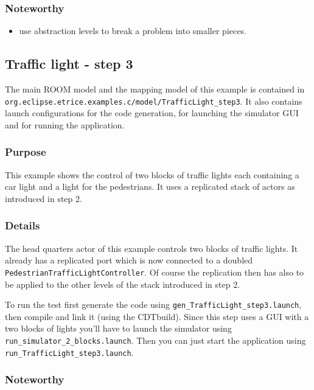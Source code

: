 \subsubsection{Noteworthy}

\begin{itemize}
\item use abstraction levels to break a problem into smaller pieces.
\end{itemize}

\subsection{Traffic light - step 3}

The main ROOM model and the mapping model of this example is contained
in \texttt{org.eclipse.etrice.examples.c/model/TrafficLight\_step3}.
It also contains launch configurations for the code generation, for
launching the simulator GUI and for
running the application.

\subsubsection{Purpose}

This example shows the control of two blocks of traffic lights
each containing a car light and a light for the pedestrians.
It uses a replicated stack of actors as introduced in step 2.

\subsubsection{Details}

The head quarters actor of this example controls two blocks of traffic
lights. It already has a replicated port which is now connected
to a doubled \texttt{PedestrianTrafficLightController}.
Of course the replication then has also to be applied to the other
levels of the stack introduced in step 2.

To run the test first generate the code using \texttt{gen\_TrafficLight\_step3.launch},
then compile and link it (using the CDTbuild). Since this step uses a GUI with a
two blocks of lights
you'll have to launch the simulator using \texttt{run\_simulator\_2\_blocks.launch}.
Then you can just start the application using \texttt{run\_TrafficLight\_step3.launch}.

\subsubsection{Noteworthy}

